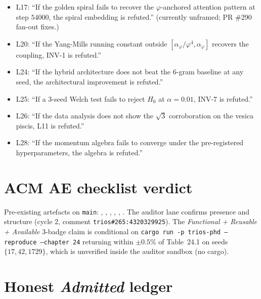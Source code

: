 \begin{itemize}
  \item L17: ``If the golden spiral fails to recover the
    $\varphi$-anchored attention pattern at step $54000$, the spiral
    embedding is refuted.'' (currently unframed; PR \#290 fan-out fixes.)
  \item L20: ``If the Yang-Mills running constant outside
    $[\alpha_{\varphi}/\varphi^{4},\alpha_{\varphi}]$ recovers the
    coupling, INV-1 is refuted.''
  \item L24: ``If the hybrid architecture does not beat the 6-gram
    baseline at any seed, the architectural improvement is refuted.''
  \item L25: ``If a 3-seed Welch test fails to reject $H_{0}$ at
    $\alpha=0{.}01$, INV-7 is refuted.''
  \item L26: ``If the data analysis does not show the
    $\sqrt{3}$ corroboration on the vesica piscis, L11 is refuted.''
  \item L28: ``If the momentum algebra fails to converge under the
    pre-registered hyperparameters, the algebra is refuted.''
\end{itemize}

\section{ACM AE checklist verdict}

Pre-existing artefacts on \texttt{main}:
,
,
,
,
, .
The auditor lane confirms presence and structure (cycle 2, comment
\texttt{trios\#265:4320329925}).
The \emph{Functional + Reusable + Available} 3-badge claim is conditional
on \texttt{cargo run -p trios-phd -- reproduce --chapter 24} returning
within $\pm 0{.}5\%$ of Table~24.1 on seeds $\{17,42,1729\}$, which is
unverified inside the auditor sandbox (no cargo).

\section{Honest \emph{Admitted} ledger}

